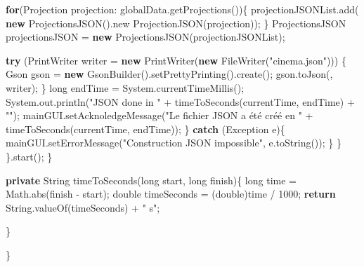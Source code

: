 \documentclass[]{article}
\newenvironment{Shaded}{}{}
\newcommand{\KeywordTok}[1]{\textcolor[rgb]{0.00,0.44,0.13}{\textbf{{#1}}}}
\newcommand{\DataTypeTok}[1]{\textcolor[rgb]{0.56,0.13,0.00}{{#1}}}
\newcommand{\DecValTok}[1]{\textcolor[rgb]{0.25,0.63,0.44}{{#1}}}
\newcommand{\StringTok}[1]{\textcolor[rgb]{0.25,0.44,0.63}{{#1}}}
\newcommand{\FunctionTok}[1]{\textcolor[rgb]{0.02,0.16,0.49}{{#1}}}
\newcommand{\BuiltInTok}[1]{{#1}}
\newcommand{\NormalTok}[1]{{#1}}
\begin{document}
\begin{Shaded}
\begin{Highlighting}[]
			  \KeywordTok{for}\NormalTok{(Projection projection: globalData.}\FunctionTok{getProjections}\NormalTok{())\{}
				\NormalTok{projectionJSONList.}\FunctionTok{add}\NormalTok{(}
				  \KeywordTok{new} \FunctionTok{ProjectionsJSON}\NormalTok{().}\FunctionTok{new} \FunctionTok{ProjectionJSON}\NormalTok{(projection));}
			  \NormalTok{\}}
			  \NormalTok{ProjectionsJSON projectionsJSON = }\KeywordTok{new} \FunctionTok{ProjectionsJSON}\NormalTok{(projectionJSONList);}

			  \KeywordTok{try} \NormalTok{(}\BuiltInTok{PrintWriter} \NormalTok{writer = }\KeywordTok{new} \BuiltInTok{PrintWriter}\NormalTok{(}\KeywordTok{new} \BuiltInTok{FileWriter}\NormalTok{(}\StringTok{"cinema.json"}\NormalTok{))) \{}
				\NormalTok{Gson gson = }\KeywordTok{new} \FunctionTok{GsonBuilder}\NormalTok{().}\FunctionTok{setPrettyPrinting}\NormalTok{().}\FunctionTok{create}\NormalTok{();}
				\NormalTok{gson.}\FunctionTok{toJson}\NormalTok{(, writer);}
			  \NormalTok{\}}
			  \DataTypeTok{long} \NormalTok{endTime = }\BuiltInTok{System}\NormalTok{.}\FunctionTok{currentTimeMillis}\NormalTok{();}
			  \BuiltInTok{System}\NormalTok{.}\FunctionTok{out}\NormalTok{.}\FunctionTok{println}\NormalTok{(}\StringTok{"JSON done in "} \NormalTok{+ }
			    \FunctionTok{timeToSeconds}\NormalTok{(currentTime, endTime) + }\StringTok{""}\NormalTok{);}
			  \NormalTok{mainGUI.}\FunctionTok{setAcknoledgeMessage}\NormalTok{(}\StringTok{"Le fichier JSON a été créé en "} 
			    \NormalTok{+ }\FunctionTok{timeToSeconds}\NormalTok{(currentTime, endTime));}
			\NormalTok{\}}
			\KeywordTok{catch} \NormalTok{(}\BuiltInTok{Exception} \NormalTok{e)\{}
				\NormalTok{mainGUI.}\FunctionTok{setErrorMessage}\NormalTok{(}\StringTok{"Construction JSON impossible"}\NormalTok{, e.}\FunctionTok{toString}\NormalTok{());}
			\NormalTok{\}}
		\NormalTok{\}}
	  \NormalTok{\}.}\FunctionTok{start}\NormalTok{();}
	\NormalTok{\}}

	\KeywordTok{private} \BuiltInTok{String} \FunctionTok{timeToSeconds}\NormalTok{(}\DataTypeTok{long} \NormalTok{start, }\DataTypeTok{long} \NormalTok{finish)\{}
		\DataTypeTok{long} \NormalTok{time = }\BuiltInTok{Math}\NormalTok{.}\FunctionTok{abs}\NormalTok{(finish - start);}
		\DataTypeTok{double} \NormalTok{timeSeconds = (}\DataTypeTok{double}\NormalTok{)time / }\DecValTok{1000}\NormalTok{;}
		\KeywordTok{return} \BuiltInTok{String}\NormalTok{.}\FunctionTok{valueOf}\NormalTok{(timeSeconds) + }\StringTok{" s"}\NormalTok{;}

	\NormalTok{\}}

\NormalTok{\}}
\end{Highlighting}
\end{Shaded}
\end{document}
